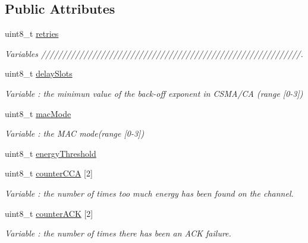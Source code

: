 \subsection*{Public Attributes}
\begin{DoxyCompactItemize}
\item 
uint8\+\_\+t \hyperlink{class_wasp_x_bee802_a7d35fb23b4d1cf6b9c542b31e0d34250}{retries}
\begin{DoxyCompactList}\small\item\em Variables /////////////////////////////////////////////////////////////. \end{DoxyCompactList}\item 
uint8\+\_\+t \hyperlink{class_wasp_x_bee802_af474c123ca9cc2c0151f232180374262}{delay\+Slots}\hypertarget{class_wasp_x_bee802_af474c123ca9cc2c0151f232180374262}{}\label{class_wasp_x_bee802_af474c123ca9cc2c0151f232180374262}

\begin{DoxyCompactList}\small\item\em Variable \+: the minimun value of the back-\/off exponent in C\+S\+M\+A/\+CA (range \mbox{[}0-\/3\mbox{]}) \end{DoxyCompactList}\item 
uint8\+\_\+t \hyperlink{class_wasp_x_bee802_a54c63539f9ce9f21aad8073f1e09e18b}{mac\+Mode}\hypertarget{class_wasp_x_bee802_a54c63539f9ce9f21aad8073f1e09e18b}{}\label{class_wasp_x_bee802_a54c63539f9ce9f21aad8073f1e09e18b}

\begin{DoxyCompactList}\small\item\em Variable \+: the M\+AC mode(range \mbox{[}0-\/3\mbox{]}) \end{DoxyCompactList}\item 
uint8\+\_\+t \hyperlink{class_wasp_x_bee802_a95f6cf094157a4fd9773074868c1e12a}{energy\+Threshold}
\item 
uint8\+\_\+t \hyperlink{class_wasp_x_bee802_ac3c86f9bfd1569e306da01238f345dc4}{counter\+C\+CA} \mbox{[}2\mbox{]}\hypertarget{class_wasp_x_bee802_ac3c86f9bfd1569e306da01238f345dc4}{}\label{class_wasp_x_bee802_ac3c86f9bfd1569e306da01238f345dc4}

\begin{DoxyCompactList}\small\item\em Variable \+: the number of times too much energy has been found on the channel. \end{DoxyCompactList}\item 
uint8\+\_\+t \hyperlink{class_wasp_x_bee802_ab5dabaafb26a931e00469212b61194b8}{counter\+A\+CK} \mbox{[}2\mbox{]}\hypertarget{class_wasp_x_bee802_ab5dabaafb26a931e00469212b61194b8}{}\label{class_wasp_x_bee802_ab5dabaafb26a931e00469212b61194b8}

\begin{DoxyCompactList}\small\item\em Variable \+: the number of times there has been an A\+CK failure. \end{DoxyCompactList}\end{DoxyCompactItemize}
